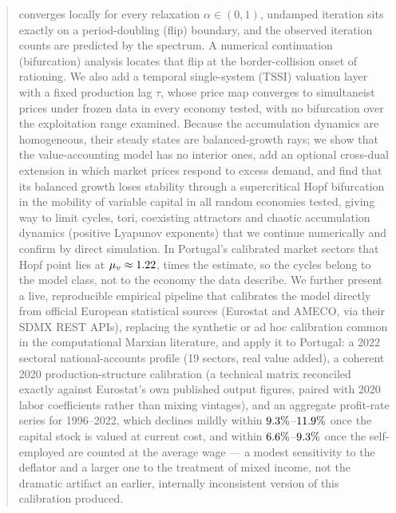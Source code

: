 \documentclass[11pt]{article}
\begin{document}
\begin{abstract}
converges locally for every relaxation $\alpha\in(0,1)$, undamped
iteration sits exactly on a period-doubling (flip) boundary, and the
observed iteration counts are predicted by the spectrum. A numerical
continuation (bifurcation) analysis locates that flip at the
border-collision onset of rationing. We also add a temporal
single-system (TSSI) valuation layer with a fixed production lag $\tau$,
whose price map converges to simultaneist prices under frozen data in
every economy tested, with no bifurcation over the exploitation range
examined. Because the accumulation dynamics are homogeneous, their
steady states are balanced-growth rays; we show that the value-accounting
model has no interior ones, add an optional cross-dual extension in which
market prices respond to excess demand, and find that its balanced growth
loses stability through a supercritical Hopf bifurcation in the mobility
of variable capital in all \AccRobN{} random economies tested, giving way to
limit cycles, tori, coexisting attractors and chaotic accumulation
dynamics (positive Lyapunov exponents) that we continue numerically and
confirm by direct simulation. In Portugal's calibrated market sectors
that Hopf point lies at $\mu_v\approx\EstHopfMuV$, \EstHopfRatio{} times
the estimate, so the cycles belong to the model class, not to the
economy the data describe. We further present a live, reproducible
empirical pipeline that calibrates the model directly from official
European statistical sources (Eurostat and AMECO, via their SDMX REST
APIs), replacing the synthetic or ad hoc calibration common in the
computational Marxian literature, and apply it to Portugal: a 2022
sectoral national-accounts profile (19 sectors, real value added), a
coherent 2020 production-structure calibration (a technical matrix
reconciled exactly against Eurostat's own published output figures,
paired with 2020 labor coefficients rather than mixing vintages), and
an aggregate profit-rate series for 1996--2022, which
declines mildly within $\AmPtCcExRMin\%$--$\AmPtCcExRMax\%$ once the
capital stock is valued at current cost, and within
$\AmPtCcImpRMin\%$--$\AmPtCcImpRMax\%$ once the self-employed are
counted at the average wage --- a modest sensitivity to the deflator and
a larger one to the treatment of mixed income, not the dramatic
artifact an earlier, internally inconsistent version of this
calibration produced.


\end{abstract}
\end{document}
